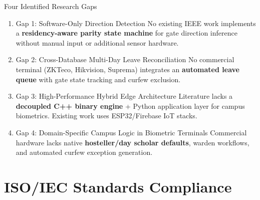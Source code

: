 \documentclass[aspectratio=169, 11pt]{beamer}
\begin{document}
\begin{frame}{Four Identified Research Gaps}
  \begin{enumerate}
    \item \begin{block}{Gap 1: Software-Only Direction Detection}
      \small No existing IEEE work implements a \textbf{residency-aware parity state machine} for gate direction inference without manual input or additional sensor hardware.
    \end{block}
    \item \begin{block}{Gap 2: Cross-Database Multi-Day Leave Reconciliation}
      \small No commercial terminal (ZKTeco, Hikvision, Suprema) integrates an \textbf{automated leave queue} with gate state tracking and curfew exclusion.
    \end{block}
    \item \begin{block}{Gap 3: High-Performance Hybrid Edge Architecture}
      \small Literature lacks a \textbf{decoupled C++ binary engine} + Python application layer for campus biometrics. Existing work uses ESP32/Firebase IoT stacks.
    \end{block}
    \item \begin{block}{Gap 4: Domain-Specific Campus Logic in Biometric Terminals}
      \small Commercial hardware lacks native \textbf{hosteller/day scholar defaults}, warden workflows, and automated curfew exception generation.
    \end{block}
  \end{enumerate}
\end{frame}

\section{ISO/IEC Standards Compliance}
\end{document}
